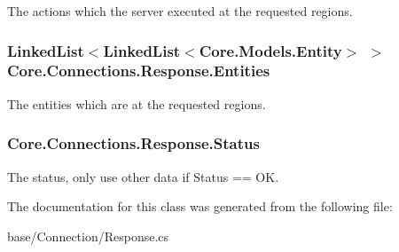 The actions which the server executed at the requested regions. 

\hypertarget{classCore_1_1Connections_1_1Response_a3e678090e1fb696f0e3c7dfaca9b1275}{}
\subsubsection[{Entities}]{\setlength{\rightskip}{0pt plus 5cm}Linked\+List$<$Linked\+List$<${\bf Core.\+Models.\+Entity}$>$ $>$ Core.\+Connections.\+Response.\+Entities}\label{classCore_1_1Connections_1_1Response_a3e678090e1fb696f0e3c7dfaca9b1275}


The entities which are at the requested regions. 

\hypertarget{classCore_1_1Connections_1_1Response_aa9f4fef77b99465a399e0af5111609ef}{}
\subsubsection[{Status}]{ Core.\+Connections.\+Response.\+Status}\label{classCore_1_1Connections_1_1Response_aa9f4fef77b99465a399e0af5111609ef}


The status, only use other data if Status == O\+K. 



The documentation for this class was generated from the following file\+:\begin{DoxyCompactItemize}
\item 
base/\+Connection/Response.\+cs\end{DoxyCompactItemize}
